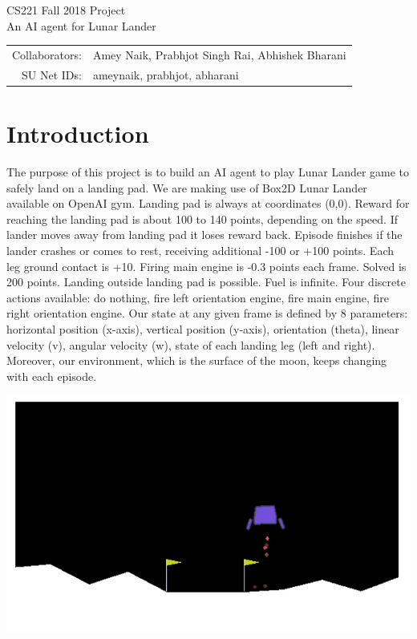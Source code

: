 \documentclass[12pt]{article}
\begin{document}
\begin{center}
{\Large CS221 Fall 2018 Project} \\
{\Large An AI agent for Lunar Lander}

\begin{tabular}{rl}
Collaborators: & Amey Naik, Prabhjot Singh Rai, Abhishek Bharani \\
SU Net IDs: & ameynaik, prabhjot, abharani
\end{tabular}
\end{center}


\section{Introduction}

The purpose of this project is to build an AI agent to play Lunar Lander game to safely land on a landing pad. We are making use of Box2D Lunar Lander available on OpenAI gym. Landing pad is always at coordinates (0,0). Reward for reaching the landing pad is about 100 to 140 points, depending on the speed. If lander moves away from landing pad it loses reward back. Episode finishes if the lander crashes or comes to rest, receiving additional -100 or +100 points. Each leg ground contact is +10. Firing main engine is -0.3 points each frame. Solved is 200 points. Landing outside landing pad is possible. Fuel is infinite. Four discrete actions available: do nothing, fire left orientation engine, fire main engine, fire right orientation engine. Our state at any given frame is defined by 8 parameters: horizontal position (x-axis), vertical position (y-axis), orientation (theta), linear velocity (v), angular velocity (w), state of each landing leg (left and right). Moreover, our environment, which is the surface of the moon, keeps changing with each episode.
\begin{center}
\includegraphics[scale=0.3]{LunarLanderDemoImage.png}
\end{center}
\end{document}
